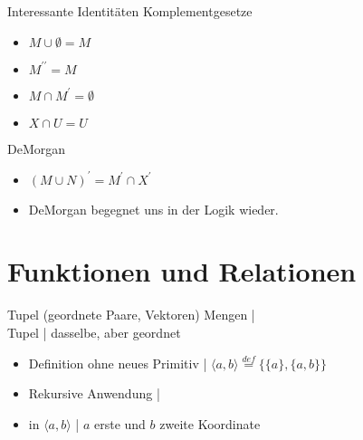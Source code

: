 \begin{frame}
  {Interessante Identitäten}
  \onslide<+->
  \onslide<+->
  Komplementgesetze\\
  \Halbzeile
  \begin{itemize}[<+->]
    \item $M\cup\emptyset=M$
    \item $M^{\prime\prime}=M$
    \item $M\cap M^{\prime}=\emptyset$
    \item $X\cap U=U$
  \end{itemize}
  \onslide<+->
  \Zeile
  DeMorgan\\
  \Halbzeile
  \begin{itemize}[<+->]
    \item $(M\cup N)^{\prime}=M^{\prime}\cap X^{\prime}$
    \item DeMorgan begegnet uns in der Logik wieder.
  \end{itemize}
\end{frame}

\section{Funktionen und Relationen}

\begin{frame}
  {Tupel (geordnete Paare, Vektoren)}
  \label{slide:tupel}
  \onslide<+->
  \onslide<+->
  Mengen |  \\
  \Viertelzeile
  \onslide<+->
  Tupel | dasselbe, aber \alert{geordnet} \\
  \Halbzeile
  \begin{itemize}[<+->]
    \item Definition ohne neues Primitiv | \alert{$\langle a,b\rangle \stackrel{def}{=} \{\{a\},\{a,b\}\}$}
    \item Rekursive Anwendung | 
      \Halbzeile
    \item in $\langle a,b\rangle$ | $a$ \alert{erste} und $b$ \alert{zweite Koordinate}
  \end{itemize}
  \Halbzeile
\end{frame}

